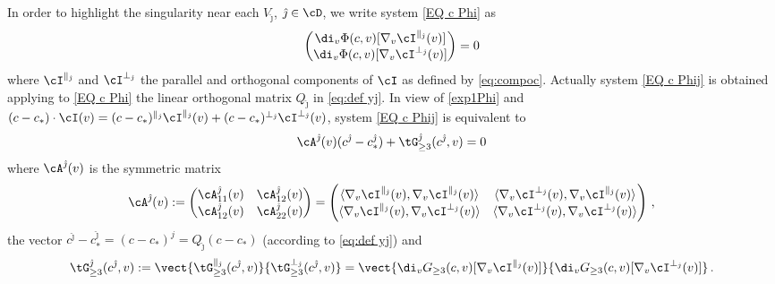 \documentclass[11pt,a4paper,reqno]{article}
\numberwithin{equation}{section}
\theoremstyle{definition}
\begin{document}
In order to highlight the singularity near each $ V_{\hat \jmath}$,  ${\hat \jmath}\in \cD$, we write  system \eqref{EQ c Phi} as 
\begin{equation}\label{EQ c Phij}
    \begin{pmatrix}
        \di_v\Phi(c,v)[\nabla_v\cI^{\parallel_{\hat \jmath}}(v)]\\
        \di_v\Phi(c,v)[\nabla_v\cI^{\bot_{\hat \jmath}}(v)]
    \end{pmatrix}=0 
\end{equation}
where $ \cI^{\parallel_{\hat \jmath}}$ and $\cI^{\bot_{\hat \jmath}}$ the parallel and orthogonal components of $\cI$ as defined by \eqref{eq:compoc}. Actually 
system \eqref{EQ c Phij} is obtained applying to \eqref{EQ c Phi}  the linear orthogonal matrix $ Q_{\hat \jmath}$  in 
\eqref{eq:def yj}. 
In view of \eqref{exp1Phi} and 
$ (c-c_*) \cdot  \cI (v) = 
(c-c_*)^{\parallel_{\hat \jmath}} \cI^{\parallel_{\hat \jmath}} (v) + 
(c-c_*)^{\bot_{\hat \jmath}} \cI^{\bot_{\hat \jmath}} (v) 
$, 
system  \eqref{EQ c Phij} is equivalent to
\begin{equation}\label{EQ c Linear system0}
    \cA^{\hat\jmath}(v)(c^{\hat \jmath}-c_*^{\hat \jmath})+ \tG^{\hat \jmath}_{\geq 3} (c^{\hat \jmath},v)=0
\end{equation}
where $\cA^{\hat \jmath}(v)$ is the symmetric  matrix 
\begin{equation}\label{Def aQ}
    \cA^{\hat \jmath}(v):= 
        \begin{pmatrix}
            \cA_{11}^{\hat \jmath} (v)  & \cA_{12}^{\hat \jmath} (v)   \\
             \cA_{12}^{\hat \jmath} (v)  &  \cA_{22}^{\hat \jmath} (v) 
        \end{pmatrix}
    = 
    \begin{pmatrix}
        \langle \nabla_v \cI^{\parallel_{\hat \jmath}}(v), \nabla_v \cI^{\parallel_{\hat \jmath}}(v)\rangle  &
        \langle \nabla_v \cI^{\bot_{\hat \jmath}}(v), \nabla_v \cI^{\parallel_{\hat \jmath}}(v)\rangle \\
        \langle \nabla_v \cI^{\parallel_{\hat \jmath}}(v), \nabla_v \cI^{\bot_{\hat \jmath}}(v)\rangle  &
        \langle \nabla_v \cI^{\bot_{\hat \jmath}}(v), \nabla_v \cI^{\bot_{\hat \jmath}}(v)\rangle 
    \end{pmatrix} \, , 
\end{equation}
 the vector $ c^{\hat \jmath}-c_*^{\hat \jmath}  = (c-c_*)^j = Q_{\hat \jmath} 
(c - c_* )$ (according to  \eqref{eq:def yj}) and 
\begin{equation}\label{Def tg}
    \tG_{\geq 3}^{\hat \jmath} (c^{\hat \jmath},v):=
    \vect{ \tG_{\geq 3}^{\parallel_{\hat \jmath}} (c^{\hat \jmath},v) }{\tG_{\geq 3}^{\bot_{\hat \jmath}} (c^{\hat \jmath},v)} =
    \vect{ \di_v G_{\geq 3}(c,v)[\nabla_v \cI^{\parallel_{\hat \jmath}}(v)]}{\di_v G_{\geq 3}(c,v)[\nabla_v \cI^{\bot_{\hat \jmath}}(v)]}\, .
\end{equation}
\end{document}
